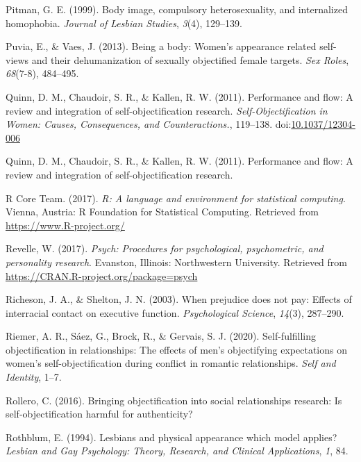 \documentclass[man]{apa6}
\begin{document}
\hypertarget{ref-pitman1999body}{}
Pitman, G. E. (1999). Body image, compulsory heterosexuality, and
internalized homophobia. \emph{Journal of Lesbian Studies}, \emph{3}(4),
129--139.

\hypertarget{ref-puvia2013being}{}
Puvia, E., \& Vaes, J. (2013). Being a body: Women's appearance related
self-views and their dehumanization of sexually objectified female
targets. \emph{Sex Roles}, \emph{68}(7-8), 484--495.

\hypertarget{ref-quinnetal}{}
Quinn, D. M., Chaudoir, S. R., \& Kallen, R. W. (2011). Performance and
flow: A review and integration of self-objectification research.
\emph{Self-Objectification in Women: Causes, Consequences, and
Counteractions.}, 119--138.
doi:\href{https://doi.org/10.1037/12304-006}{10.1037/12304-006}

\hypertarget{ref-quinn2011performance}{}
Quinn, D. M., Chaudoir, S. R., \& Kallen, R. W. (2011). Performance and
flow: A review and integration of self-objectification research.

\hypertarget{ref-R-base}{}
R Core Team. (2017). \emph{R: A language and environment for statistical
computing}. Vienna, Austria: R Foundation for Statistical Computing.
Retrieved from \url{https://www.R-project.org/}

\hypertarget{ref-R-psych}{}
Revelle, W. (2017). \emph{Psych: Procedures for psychological,
psychometric, and personality research}. Evanston, Illinois:
Northwestern University. Retrieved from
\url{https://CRAN.R-project.org/package=psych}

\hypertarget{ref-richeson2003prejudice}{}
Richeson, J. A., \& Shelton, J. N. (2003). When prejudice does not pay:
Effects of interracial contact on executive function.
\emph{Psychological Science}, \emph{14}(3), 287--290.

\hypertarget{ref-riemer2020self}{}
Riemer, A. R., Sáez, G., Brock, R., \& Gervais, S. J. (2020).
Self-fulfilling objectification in relationships: The effects of men's
objectifying expectations on women's self-objectification during
conflict in romantic relationships. \emph{Self and Identity}, 1--7.

\hypertarget{ref-rollero2016bringing}{}
Rollero, C. (2016). Bringing objectification into social relationships
research: Is self-objectification harmful for authenticity?

\hypertarget{ref-rothblum1994lesbians}{}
Rothblum, E. (1994). Lesbians and physical appearance which model
applies? \emph{Lesbian and Gay Psychology: Theory, Research, and
Clinical Applications}, \emph{1}, 84.
\end{document}
